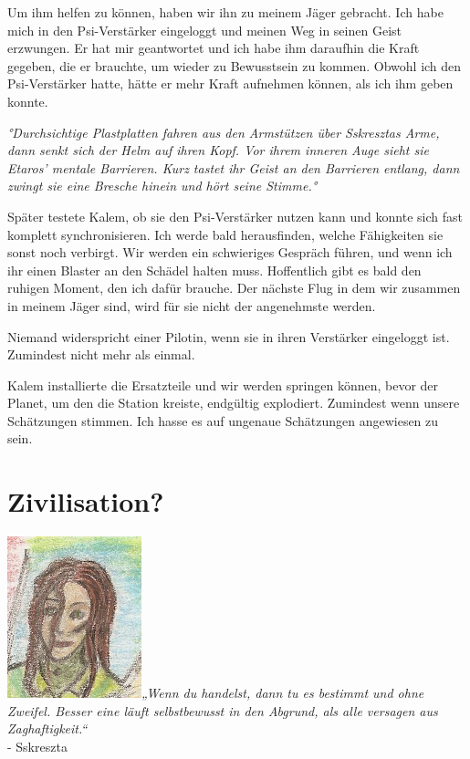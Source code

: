 \documentclass[11pt]{scrartcl}
\begin{document}
Um ihm helfen zu können, haben wir ihn zu meinem Jäger gebracht. Ich
habe mich in den Psi-Verstärker eingeloggt und meinen Weg in seinen
Geist erzwungen. Er hat mir geantwortet und ich habe ihm daraufhin die
Kraft gegeben, die er brauchte, um wieder zu Bewusstsein zu kommen.
Obwohl ich den Psi-Verstärker hatte, hätte er mehr Kraft aufnehmen
können, als ich ihm geben konnte.

\emph{°Durchsichtige Plastplatten fahren aus den Armstützen über
Sskresztas Arme, dann senkt sich der Helm auf ihren Kopf. Vor ihrem
inneren Auge sieht sie Etaros' mentale Barrieren. Kurz tastet ihr Geist
an den Barrieren entlang, dann zwingt sie eine Bresche hinein und hört
seine Stimme.°}

Später testete Kalem, ob sie den Psi-Verstärker nutzen kann und konnte
sich fast komplett synchronisieren. Ich werde bald herausfinden, welche
Fähigkeiten sie sonst noch verbirgt. Wir werden ein schwieriges Gespräch
führen, und wenn ich ihr einen Blaster an den Schädel halten muss.
Hoffentlich gibt es bald den ruhigen Moment, den ich dafür brauche. Der
nächste Flug in dem wir zusammen in meinem Jäger sind, wird für sie
nicht der angenehmste werden.

Niemand widerspricht einer Pilotin, wenn sie in ihren Verstärker
eingeloggt ist. Zumindest nicht mehr als einmal.

Kalem installierte die Ersatzteile und wir werden springen können, bevor
der Planet, um den die Station kreiste, endgültig explodiert. Zumindest
wenn unsere Schätzungen stimmen. Ich hasse es auf ungenaue Schätzungen
angewiesen zu sein.

\section{Zivilisation?}

\includegraphics{sskreszta-portrait-alt-klein.png}\emph{„Wenn du
handelst, dann tu es bestimmt und ohne Zweifel. Besser eine läuft
selbstbewusst in den Abgrund, als alle versagen aus Zaghaftigkeit.``}\\
- Sskreszta
\end{document}

